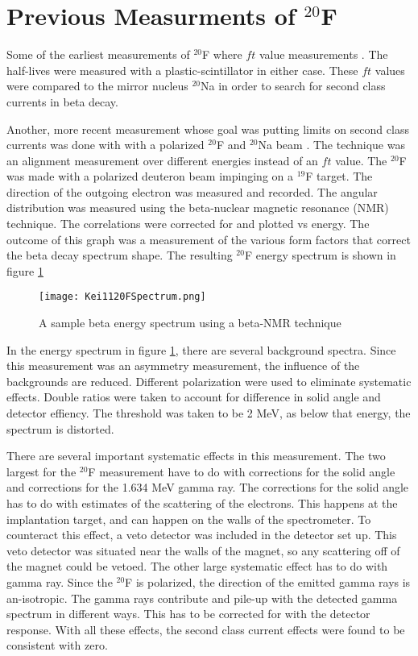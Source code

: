 \documentclass[main.tex]{subfiles}
\begin{document}
\section{Previous Measurments of $^{20}$F}

Some of the earliest measurements of $^{20}$F where $ft$ value measurements \cite{Wil70} \cite{Alb75}.
The half-lives were measured with a plastic-scintillator in either case.  
These $ft$ values were compared to the mirror nucleus $^{20}$Na in order to search for second class currents in beta decay. 

Another, more recent measurement whose goal was putting limits on second class currents was done with with a polarized $^{20}$F and $^{20}$Na beam \cite{Min11}.
The technique was an alignment measurement over different energies instead of an $ft$ value. 
The $^{20}$F was made with a polarized deuteron beam impinging on a $^{19}$F target. 
The direction of the outgoing electron was measured and recorded.
The angular distribution was measured using the beta-nuclear magnetic resonance (NMR) technique.
The correlations were corrected for and plotted vs energy.
The outcome of this graph was a measurement of the various form factors that correct the beta decay spectrum shape. 
The resulting $^{20}$F energy spectrum is shown in figure \ref{fig:keispec}

\begin{figure}[!htb]
	\centerline{\texttt{[image: Kei1120FSpectrum.png]}}
	\caption{A sample beta energy spectrum using a beta-NMR technique \cite{Min11}}
	\label{fig:keispec}
\end{figure}

In the energy spectrum in figure \ref{fig:keispec}, there are several background spectra. 
Since this measurement  was an asymmetry measurement, the influence of the backgrounds are reduced. 
Different polarization were used to eliminate systematic effects.
Double ratios were taken to account for difference in solid angle and detector effiency.
The threshold was taken to be 2 MeV, as below that energy, the spectrum is distorted.

There are several important systematic effects in this measurement.
The two largest for the $^{20}$F measurement have to do with corrections for the solid angle and corrections for the 1.634 MeV gamma ray.
The corrections for the solid angle has to do with estimates of the scattering of the electrons.
This happens at the implantation target, and can happen on the walls of the spectrometer.
To counteract this effect, a veto detector was included in the detector set up. 
This veto detector was situated near the walls of the magnet, so any scattering off of the magnet could be vetoed. 
The other large systematic effect has to do with gamma ray.
Since the $^{20}$F is polarized, the direction of the emitted gamma rays is an-isotropic.
The gamma rays contribute and pile-up with the detected gamma spectrum in different ways.
This has to be corrected for with the detector response.
With all these effects, the second class current effects were found to be consistent with zero.   
\end{document}
